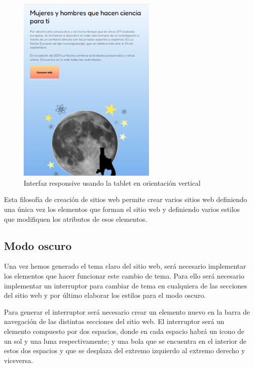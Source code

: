 \begin{figure}[H]
\centering
\includegraphics[width=0.6\textwidth]{imagenes/07_Implementacion/responsive_tablet.png}
\caption{Interfaz responsive usando la tablet en orientación vertical}
\label{fig:responsive_tablet}
\end{figure}

Esta filosofía de creación de sitios web permite crear varios sitios web definiendo una única vez los elementos que forman el sitio web y definiendo varios estilos que modifiquen los atributos de esos elementos.

\subsection{Modo oscuro}

Una vez hemos generado el tema claro del sitio web, será necesario implementar los elementos que hacer funcionar este cambio de tema. Para ello será necesario implementar un interruptor para cambiar de tema en cualquiera de las secciones del sitio web y por último elaborar los estilos para el modo oscuro.

Para generar el interruptor será necesario crear un elemento nuevo en la barra de navegación de las distintas secciones del sitio web. El interruptor será un elemento compuesto por dos espacios, donde en cada espacio habrá un icono de un sol y una luna respectivamente; y una bola que se encuentra en el interior de estos dos espacios y que se desplaza del extremo izquierdo al extremo derecho y viceversa.

